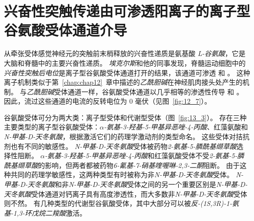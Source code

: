 \section{兴奋性突触传递由可渗透阳离子的离子型谷氨酸受体通道介导}

从牵张受体感觉神经元的突触前末梢释放的兴奋性递质是氨基酸 \textit{L-谷氨酸}，它是大脑和脊髓中的主要兴奋性递质。
\textit{埃克尔斯}和他的同事发现，脊髓运动细胞中的\textit{兴奋性突触后电位}是离子型谷氨酸受体通道打开的结果，该通道可渗透  和 。
这种离子机制类似于第~\ref{chap:chap12}~章中描述的\textit{乙酰胆碱}在神经肌肉接头处产生的机制。
与\textit{乙酰胆碱}受体通道一样，谷氨酸受体通道以几乎相等的渗透性传导  和 。
因此，流过这些通道的电流的反转电位为 0 毫伏（见图~\ref{fig:12_7}）。


谷氨酸受体可分为两大类：离子型受体和代谢型受体（图~\ref{fig:13_3}）。 
存在三种主要类型的离子型谷氨酸受体：\textit{$\alpha$-氨基-3-羟基-5-甲基异恶唑-4-丙酸}、红藻氨酸和\textit{N-甲基-D-天冬氨酸}，根据激活它们的药理学激动剂的类型命名。
这些受体对拮抗剂也有不同的敏感性。
\textit{N-甲基-D-天冬氨酸}受体被药物\textit{2-氨基-5-膦酰基缬草酸}选择性阻断。
\textit{$\alpha$-氨基-3-羟基-5-甲基异恶唑-4-丙酸}和红藻氨酸受体不受\textit{2-氨基-5-膦酰基缬草酸}的影响，但两者都被药物\textit{6-氰基-7-硝基喹喔啉-2,3-二酮}阻断。
由于这种共同的药理学敏感性，这两种类型有时被称为非\textit{N-甲基-D-天冬氨酸}受体。
\textit{N-甲基-D-天冬氨酸}和非\textit{N-甲基-D-天冬氨酸}受体之间的另一个重要区别是\textit{N-甲基-D-天冬氨酸}受体通道对钙离子具有高度渗透性，而大多数非\textit{N-甲基-D-天冬氨酸}受体则不然。
有几种类型的代谢型谷氨酸受体，其中大部分可以被\textit{反-(1S,3R)-1-氨基-1,3-环戊烷二羧酸}激活。


